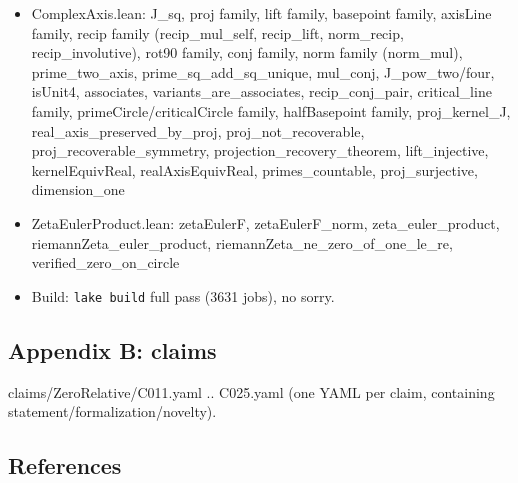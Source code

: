 \documentclass[
]{article}
\providecommand{\tightlist}{%
  \setlength{\itemsep}{0pt}\setlength{\parskip}{0pt}}
\begin{document}
\begin{itemize}
\tightlist
\item
  ComplexAxis.lean: J\_sq, proj family, lift family, basepoint family,
  axisLine family, recip family (recip\_mul\_self, recip\_lift,
  norm\_recip, recip\_involutive), rot90 family, conj family, norm
  family (norm\_mul), prime\_two\_axis, prime\_sq\_add\_sq\_unique,
  mul\_conj, J\_pow\_two/four, isUnit4, associates,
  variants\_are\_associates, recip\_conj\_pair, critical\_line family,
  primeCircle/criticalCircle family, halfBasepoint family,
  proj\_kernel\_J, real\_axis\_preserved\_by\_proj,
  proj\_not\_recoverable, proj\_recoverable\_symmetry,
  projection\_recovery\_theorem, lift\_injective, kernelEquivReal,
  realAxisEquivReal, primes\_countable, proj\_surjective, dimension\_one
\item
  ZetaEulerProduct.lean: zetaEulerF, zetaEulerF\_norm,
  zeta\_euler\_product, riemannZeta\_euler\_product,
  riemannZeta\_ne\_zero\_of\_one\_le\_re, verified\_zero\_on\_circle
\item
  Build: \texttt{lake\ build} full pass (3631 jobs), no sorry.
\end{itemize}

\subsection{Appendix B: claims}\label{appendix-b-claims}

claims/ZeroRelative/C011.yaml .. C025.yaml (one YAML per claim,
containing statement/formalization/novelty).

\subsection{References}\label{references}
\end{document}
